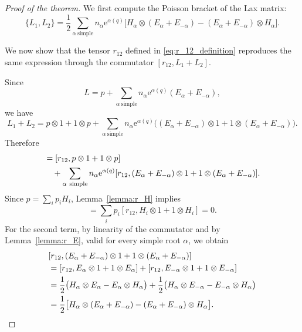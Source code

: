 \begin{proof}[Proof of the theorem]
    We first compute the Poisson bracket of the Lax matrix:
    \begin{equation}
        \{L_1,L_2\}
        =
        \frac12 \sum_{\alpha\ \text{simple}}
        n_\alpha \mathrm{e}^{\alpha(q)}
        \bigl[
        H_\alpha \otimes (E_\alpha + E_{-\alpha})
        -
        (E_\alpha + E_{-\alpha}) \otimes H_\alpha
        \bigr].
    \end{equation}

    We now show that the tensor $r_{12}$ defined in \eqref{eq:r_12_definition} reproduces the same expression through the commutator $[r_{12},L_1+L_2]$.

    Since
    \begin{equation}
        L
        =
        p
        +
        \sum_{\alpha\ \text{simple}}
        n_\alpha \mathrm{e}^{\alpha(q)} (E_\alpha+E_{-\alpha}),
    \end{equation}
    we have
    \begin{equation}
        L_1+L_2
        =
        p \otimes 1 + 1 \otimes p
        +
        \sum_{\alpha\ \text{simple}}
        n_\alpha \mathrm{e}^{\alpha(q)}
        \bigl(
        (E_\alpha+E_{-\alpha}) \otimes 1
        +
        1 \otimes (E_\alpha+E_{-\alpha})
        \bigr).
    \end{equation}
    Therefore
    \begin{align}
        [r_{12},L_1+L_2]
        &=
        [r_{12},p \otimes 1 + 1 \otimes p] \notag \\
        &\quad +
        \sum_{\alpha\ \text{simple}}
        n_\alpha \mathrm{e}^{\alpha(q)}
        [r_{12},(E_\alpha+E_{-\alpha}) \otimes 1 + 1 \otimes (E_\alpha+E_{-\alpha})].
    \end{align}
    Since $p=\sum_i p_i H_i$, Lemma~\ref{lemma:r_H} implies
    \begin{equation}
        [r_{12},p \otimes 1 + 1 \otimes p]
        =
        \sum_i p_i [r_{12},H_i \otimes 1 + 1 \otimes H_i]
        =
        0.
    \end{equation}
    For the second term, by linearity of the commutator and by Lemma~\ref{lemma:r_E}, valid for every simple root $\alpha$, we obtain
    \begin{align}
        & [r_{12},(E_\alpha+E_{-\alpha}) \otimes 1 + 1 \otimes (E_\alpha+E_{-\alpha})] \notag \\
        &= [r_{12},E_\alpha \otimes 1 + 1 \otimes E_\alpha]
        +
        [r_{12},E_{-\alpha} \otimes 1 + 1 \otimes E_{-\alpha}] \notag \\
        &= \frac12
        \bigl(
        H_\alpha \otimes E_\alpha - E_\alpha \otimes H_\alpha
        \bigr)
        +
        \frac12
        \bigl(
        H_\alpha \otimes E_{-\alpha} - E_{-\alpha} \otimes H_\alpha
        \bigr) \notag \\
        &= \frac12
        \bigl[
        H_\alpha \otimes (E_\alpha+E_{-\alpha})
        -
        (E_\alpha+E_{-\alpha}) \otimes H_\alpha
        \bigr].
    \end{align}


\end{proof}
